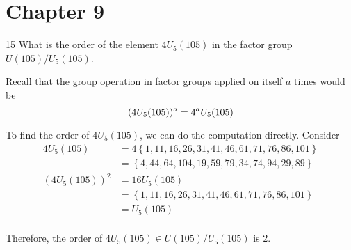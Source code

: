 \newpage

\section*{Chapter 9}

\begin{hwproblem}
{15}{
    What is the order of the element \(4U_5(105)\) in the factor group \(U(105) / U_5(105)\).
}

Recall that the group operation in factor groups applied on itself \(a\) times would be
\[
    (4U_5(105))^a = 4^a U_5(105) \\
\]


To find the order of \(4U_5(105)\), we can do the computation directly. Consider
\[
\begin{aligned}
    4U_5(105) &= 4\left\{1, 11, 16, 26, 31, 41, 46, 61, 71, 76, 86, 101\right\} \\
              &= \left\{4, 44, 64, 104, 19, 59, 79, 34, 74, 94, 29, 89\right\} \\
    (4U_5(105))^2 &= 16U_5(105) \\
                  &= \left\{1, 11, 16, 26, 31, 41, 46, 61, 71, 76, 86, 101\right\} \\
                  &= U_5(105) \\
\end{aligned}
\]

Therefore, the order of \(4U_5(105) \in U(105)/U_5(105)\) is 2.
\end{hwproblem}

